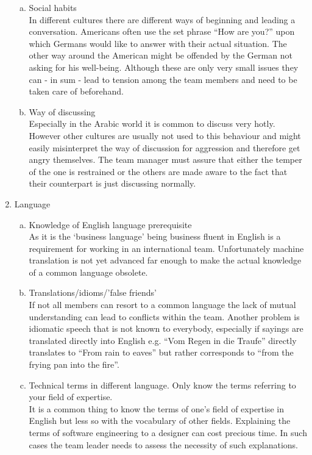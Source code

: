 \begin{multicols}{2}
\begin{enumerate}[1.]
\begin{enumerate}[a)]
		  \item Social habits \\ In different cultures there are different ways of beginning and leading a conversation. Americans often use the set phrase “How are you?” upon which Germans would like to answer with their actual situation. The other way around the American might be offended by the German not asking for his well-being. Although these are only very small issues they can - in sum - lead to tension among the team members and need to be taken care of beforehand.
		  	\item Way of discussing \\ Especially in the Arabic world it is common to discuss very hotly. However other cultures are usually not used to this behaviour and might easily misinterpret the way of discussion for aggression and therefore get angry themselves. The team  manager must assure that either the temper of the one is restrained or the others are made aware to the fact that their counterpart is just discussing normally.
		\end{enumerate}
\item Language
		\begin{enumerate}[a)]
		  \item Knowledge of English language prerequisite \\
As it is the ‘business language’ being business fluent in English is a requirement for working in an international team. Unfortunately machine translation is not yet advanced far enough to make the actual knowledge of a common language obsolete.
		  \item Translations/idioms/’false friends’\\
If not all members can resort to a common language the lack of mutual understanding can lead to conflicts within the team. Another problem is idiomatic speech that is not known to everybody, especially if sayings are translated directly into English e.g. “Vom Regen in die Traufe” directly translates to “From rain to eaves” but rather corresponds to “from the frying pan into the fire”.
		  \item Technical terms in different language. Only know the terms referring to your field of expertise. \\
It is a common thing to know the terms of one’s field of expertise in English but less so with the vocabulary of other fields. Explaining the terms of software engineering to a designer can cost precious time. In such cases the team leader needs to assess the necessity of such explanations.
		\end{enumerate}
\end{enumerate}
\end{multicols}